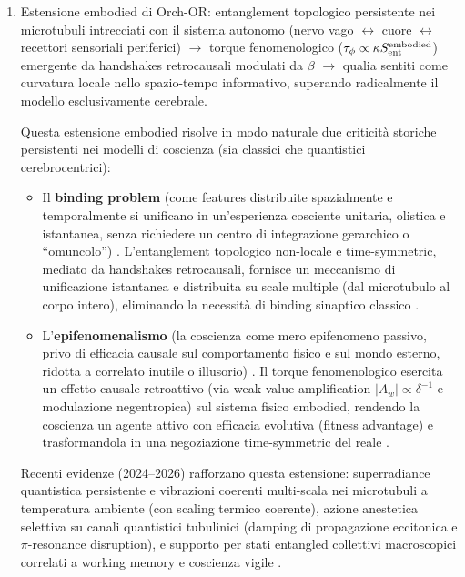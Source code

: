 \documentclass[11pt,a4paper]{article}
\let\oldcite\cite
\renewcommand{\cite}{\protect\oldcite}
\theoremstyle{plain}
\theoremstyle{definition}
\begin{document}
\begin{enumerate}
    \item Estensione embodied di Orch-OR: entanglement topologico persistente nei microtubuli intrecciati con il sistema autonomo (nervo vago $\leftrightarrow$ cuore $\leftrightarrow$ recettori sensoriali periferici) $\to$ torque fenomenologico ($\tau_\phi \propto \kappa S_{\rm ent}^{\rm embodied}$) emergente da handshakes retrocausali modulati da $\beta$ $\to$ qualia sentiti come curvatura locale nello spazio-tempo informativo, superando radicalmente il modello esclusivamente cerebrale.

    Questa estensione embodied risolve in modo naturale due criticità storiche persistenti nei modelli di coscienza (sia classici che quantistici cerebrocentrici):

    \begin{itemize}
        \item Il \textbf{binding problem} (come features distribuite spazialmente e temporalmente si unificano in un'esperienza cosciente unitaria, olistica e istantanea, senza richiedere un centro di integrazione gerarchico o ``omuncolo'') \cite{Revonsuo1999, Feldman2013}. L'entanglement topologico non-locale e time-symmetric, mediato da handshakes retrocausali, fornisce un meccanismo di unificazione istantanea e distribuita su scale multiple (dal microtubulo al corpo intero), eliminando la necessità di binding sinaptico classico \cite{Wiest2025}.
        
        \item L'\textbf{epifenomenalismo} (la coscienza come mero epifenomeno passivo, privo di efficacia causale sul comportamento fisico e sul mondo esterno, ridotta a correlato inutile o illusorio) \cite{Jackson1982, Chalmers1996}. Il torque fenomenologico esercita un effetto causale retroattivo (via weak value amplification $|A_w| \propto \delta^{-1}$ e modulazione negentropica) sul sistema fisico embodied, rendendo la coscienza un agente attivo con efficacia evolutiva (fitness advantage) e trasformandola in una negoziazione time-symmetric del reale \cite{Wiest2025}.
    \end{itemize}

    Recenti evidenze (2024--2026) rafforzano questa estensione: superradiance quantistica persistente e vibrazioni coerenti multi-scala nei microtubuli a temperatura ambiente (con scaling termico coerente), azione anestetica selettiva su canali quantistici tubulinici (damping di propagazione eccitonica e $\pi$-resonance disruption), e supporto per stati entangled collettivi macroscopici correlati a working memory e coscienza vigile \cite{Wiest2025, babcock2024superradiance}.


\end{enumerate}
\end{document}
